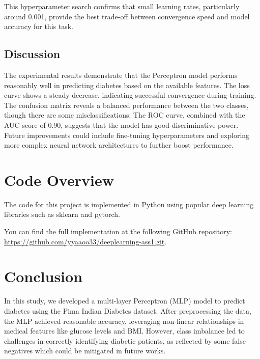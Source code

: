 \documentclass[10pt,twocolumn,letterpaper]{article}
\begin{document}
This hyperparameter search confirms that small learning rates, particularly around 0.001, provide the best trade-off between convergence speed and model accuracy for this task.

\subsection{Discussion}
The experimental results demonstrate that the Perceptron model performs reasonably well in predicting diabetes based on the available features. The loss curve shows a steady decrease, indicating successful convergence during training. The confusion matrix reveals a balanced performance between the two classes, though there are some misclassifications. The ROC curve, combined with the AUC score of 0.90, suggests that the model has good discriminative power. Future improvements could include fine-tuning hyperparameters and exploring more complex neural network architectures to further boost performance.


\section{Code Overview}
The code for this project is implemented in Python using popular deep learning libraries such as sklearn and pytorch.

You can find the full implementation at the following GitHub repository: \url{https://github.com/yyaaoo33/deeplearning-ass1.git}.


\section{Conclusion}

In this study, we developed a multi-layer Perceptron (MLP) model to predict diabetes using the Pima Indian Diabetes dataset. After preprocessing the data, the MLP achieved reasonable accuracy, leveraging non-linear relationships in medical features like glucose levels and BMI. However, class imbalance led to challenges in correctly identifying diabetic patients, as reflected by some false negatives which could be mitigated in future works.


{\small


}
\end{document}
